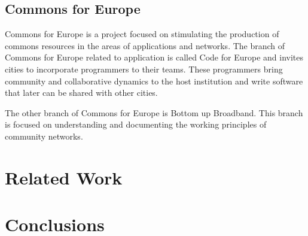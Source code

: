 \documentclass[journal]{IEEEtran}
\begin{document}
\subsection{Commons for Europe}
Commons for Europe is a project focused on stimulating the production of commons resources in the areas of applications and networks.
The branch of Commons for Europe related to application is called Code for Europe and invites cities to incorporate programmers to their teams.
These programmers bring community and collaborative dynamics to the host institution and write software that later can be shared with other cities.

The other branch of Commons for Europe is Bottom up Broadband.
This branch is focused on understanding and documenting the working principles of community networks.


\section{Related Work}
\cite{bogliolo2007uwc}
\section{Conclusions}


%
%

\end{document}
